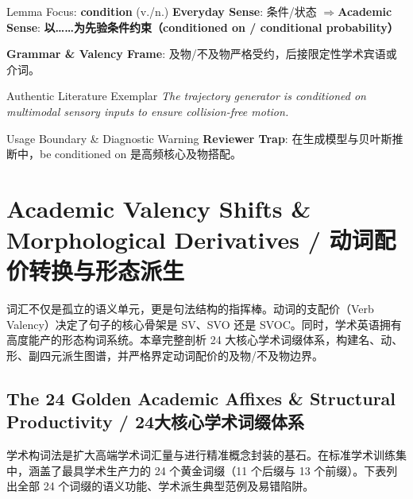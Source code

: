 \begin{ConceptBox}{Lemma Focus: \textbf{condition} (v./n.)}
\textbf{Everyday Sense}: 条件/状态 \quad$\Longrightarrow$\quad \textbf{Academic Sense}: \textbf{以……为先验条件约束（conditioned on / conditional probability）}\par\vspace{3pt}
\textbf{Grammar \& Valency Frame}: 及物/不及物严格受约，后接限定性学术宾语或介词。\par
\end{ConceptBox}
\begin{ExampleBox}{Authentic Literature Exemplar}
\textit{The trajectory generator is conditioned on multimodal sensory inputs to ensure collision-free motion.}
\end{ExampleBox}
\begin{TipBox}{Usage Boundary \& Diagnostic Warning}
\textbf{Reviewer Trap}: 在生成模型与贝叶斯推断中，be conditioned on 是高频核心及物搭配。
\end{TipBox}
\vspace{6pt}
\chapter{Academic Valency Shifts \& Morphological Derivatives / 动词配价转换与形态派生}\label{ch:valency}
词汇不仅是孤立的语义单元，更是句法结构的指挥棒。动词的支配价（Verb Valency）决定了句子的核心骨架是 SV、SVO 还是 SVOC。同时，学术英语拥有高度能产的形态构词系统。本章完整剖析 24 大核心学术词缀体系，构建名、动、形、副四元派生图谱，并严格界定动词配价的及物/不及物边界。

\section{The 24 Golden Academic Affixes \& Structural Productivity / 24大核心学术词缀体系}
学术构词法是扩大高端学术词汇量与进行精准概念封装的基石。在标准学术训练集中，涵盖了最具学术生产力的 24 个黄金词缀（11 个后缀与 13 个前缀）。下表列出全部 24 个词缀的语义功能、学术派生典型范例及易错陷阱。

